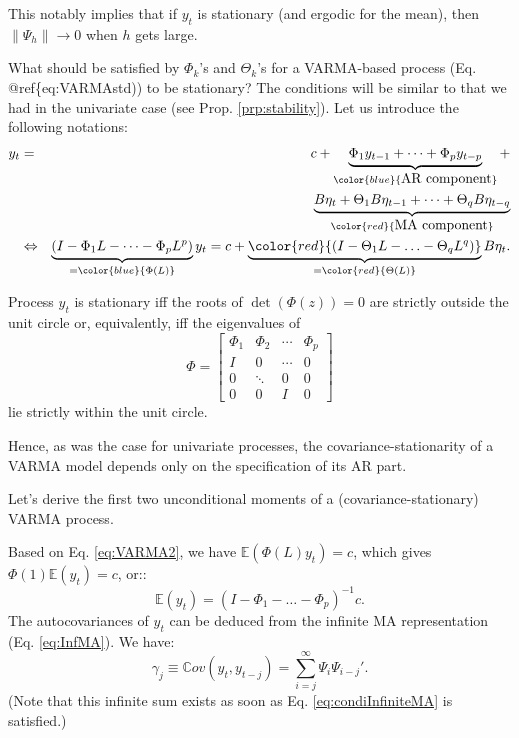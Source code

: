 \documentclass[
  12pt,
]{book}
\theoremstyle{definition}
\theoremstyle{definition}
\theoremstyle{definition}
\theoremstyle{definition}
\theoremstyle{remark}
\begin{document}
This notably implies that if \(y_t\) is stationary (and ergodic for the mean), then \(\|\Psi_h\|\rightarrow 0\) when \(h\) gets large.

What should be satisfied by \(\Phi_k\)'s and \(\Theta_k\)'s for a VARMA-based process (Eq. @ref\{eq:VARMAstd)) to be stationary? The conditions will be similar to that we had in the univariate case (see Prop. \ref{prp:stability}). Let us introduce the following notations:
\begin{eqnarray}
y_t &=& c + \underbrace{\Phi_1 y_{t-1} + \dots +\Phi_p y_{t-p}}_{\color{blue}{\mbox{AR component}}} +  \label{eq:VARMA2}\\
&&\underbrace{B \eta_t+ \Theta_1 B \eta_{t-1}+ \dots+ \Theta_q B \eta_{t-q}}_{\color{red}{\mbox{MA component}}} \nonumber\\
&\Leftrightarrow& \underbrace{(I - \Phi_1 L - \dots - \Phi_p L^p)}_{= \color{blue}{\Phi(L)}}y_t = c +  \underbrace{ \color{red}{(I - \Theta_1 L - \ldots - \Theta_q L^q)}}_{=\color{red}{\Theta(L)}} B \eta_{t}. \nonumber
\end{eqnarray}

Process \(y_t\) is stationary iff the roots of \(\det(\Phi(z))=0\) are strictly outside the unit circle or, equivalently, iff the eigenvalues of
\begin{equation}
\Phi = \left[\begin{array}{cccc}
\Phi_{1} & \Phi_{2} & \cdots & \Phi_{p}\\
I & 0 & \cdots & 0\\
0 & \ddots & 0 & 0\\
0 & 0 & I & 0\end{array}\right]\label{eq:matrixPHI}
\end{equation}
lie strictly within the unit circle.

Hence, as was the case for univariate processes, the covariance-stationarity of a VARMA model depends only on the specification of its AR part.

Let's derive the first two unconditional moments of a (covariance-stationary) VARMA process.

Based on Eq. \eqref{eq:VARMA2}, we have \(\mathbb{E}(\Phi(L)y_t)=c\), which gives \(\Phi(1)\mathbb{E}(y_t)=c\), or::
\[
\mathbb{E}(y_t) = (I - \Phi_1 - \dots - \Phi_p)^{-1}c.
\]
The autocovariances of \(y_t\) can be deduced from the infinite MA representation (Eq. \eqref{eq:InfMA}). We have:
\[
\gamma_j \equiv \mathbb{C}ov(y_t,y_{t-j}) = \sum_{i=j}^\infty \Psi_i \Psi_{i-j}'.
\]
(Note that this infinite sum exists as soon as Eq. \eqref{eq:condiInfiniteMA} is satisfied.)
\end{document}
